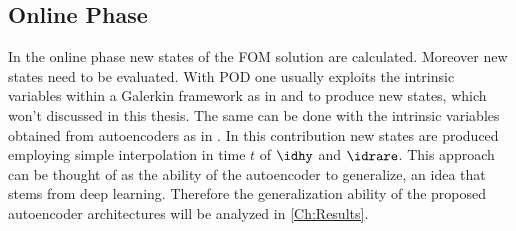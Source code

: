 \subsection{Online Phase}
In the online phase new states of the FOM solution are calculated. Moreover new states need to be evaluated. With POD one usually exploits the intrinsic variables within a Galerkin framework as in \cite{Bernard} and \cite{Carlberg} to produce new states, which won't discussed in this thesis. The same can be done with the intrinsic variables obtained from autoencoders as in \cite{Carlberg}. In this contribution new states are produced employing simple interpolation in time \(t\) of \(\idhy\) and \(\idrare\). This approach can be thought of as the ability of the autoencoder to generalize, an idea that stems from deep learning. Therefore the generalization ability of the proposed autoencoder architectures will be analyzed in \cref{Ch:Results}.   